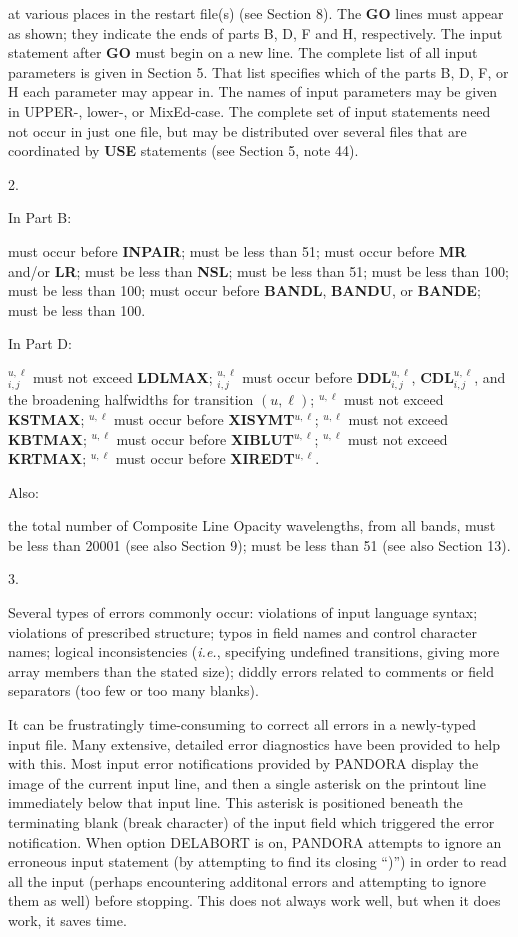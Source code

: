 at various \break places in the restart file(s) (see Section 8).
\blankline
The {\bf GO} lines must appear as shown; they indicate the ends of parts
B, D, F and H, respectively. The input statement after
{\bf GO} must begin on a new line.
\blankline
The complete list of all input parameters is given in Section 5. That
list specifies which of the parts B, D, F, or H each parameter may
appear in. The names of input parameters may be given in UPPER-, 
lower-, or MixEd-case. The complete set of input statements need not
occur in just one file, but may be distributed over several files
that are coordinated by {\bf USE} statements (see Section 5, note 44).
\ej
\centerline{2. }
\blankline
\blankline
\centerline{In Part B:}
 must occur before {\bf INPAIR};
 must be less than 51;
 must occur before {\bf MR} and/or {\bf LR};
 must be less than {\bf NSL};
 must be less than 51;
 must be less than 100;
 must be less than 100;
 must occur before {\bf BANDL}, {\bf BANDU}, or {\bf BANDE};
 must be less than 100.
\blankline
\blankline
\centerline{In Part D:}
$_{i,j}^{u,\ell}$ must not exceed {\bf LDLMAX};
$_{i,j}^{u,\ell}$ must occur before 
{\bf DDL}$_{i,j}^{u,\ell}$, {\bf CDL}$_{i,j}^{u,\ell}$, and the
broadening halfwidths for transition $(u,\ell)$;
$^{u,\ell}$ must not exceed {\bf KSTMAX};
$^{u,\ell}$ must occur before {\bf XISYMT}$^{u,\ell}$;
$^{u,\ell}$ must not exceed {\bf KBTMAX};
$^{u,\ell}$ must occur before {\bf XIBLUT}$^{u,\ell}$;
$^{u,\ell}$ must not exceed {\bf KRTMAX};
$^{u,\ell}$ must occur before {\bf XIREDT}$^{u,\ell}$.
\blankline
\blankline
\centerline{Also:}
\bull the total number of Composite Line Opacity wavelengths, from all
bands, must be less than 20001 (see also Section 9);
 must be less than 51 (see also Section 13).
\ej
\centerline{3. }
\blankline
\blankline
Several types of errors commonly occur: violations of input language
syntax; violations of prescribed structure; typos in field names and
control character names; logical inconsistencies ({\it i.e.}, 
specifying undefined transitions, giving more array members than
the stated size); diddly errors related to comments or field
separators (too few or too many blanks).

It can be frustratingly time-consuming to correct all errors in a 
newly-typed input file. Many extensive, detailed error diagnostics
have been provided to help with this. Most input error notifications
provided by PANDORA display the image of the current input line, and
then a single asterisk on the printout line immediately below that 
input line. This asterisk is positioned beneath the terminating blank
(break character) of the input field which triggered the error
notification.
\blankline
When option DELABORT is on, PANDORA attempts to ignore an erroneous
input statement (by attempting to find its closing ``)'') in order
to read all the input (perhaps encountering additonal errors and
attempting to ignore them as well) before stopping. This does not
always work well, but when it does work, it saves time.


